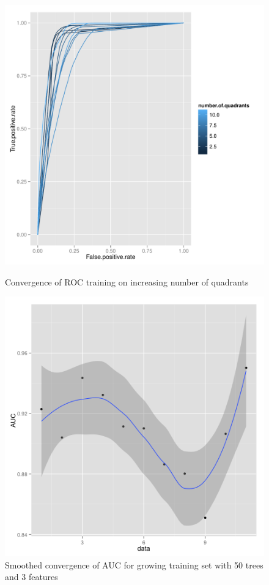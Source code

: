 \documentclass{article}\usepackage[]{graphicx}\usepackage[]{color}
\begin{document}
\begin{figure}[H]
  \includegraphics[width=\linewidth, height = 170pts]{ROC_converge1.pdf}
    \caption{Convergence of ROC training on increasing number of quadrants}\label{}
\endminipage
{}

\includegraphics[width=\linewidth, height = 170pts]{AUCconverge.png}
  \caption{Smoothed convergence of AUC for growing training set with 50 trees and 3 features}\label{}
\endminipage

  \end{figure}
  
\end{document}
